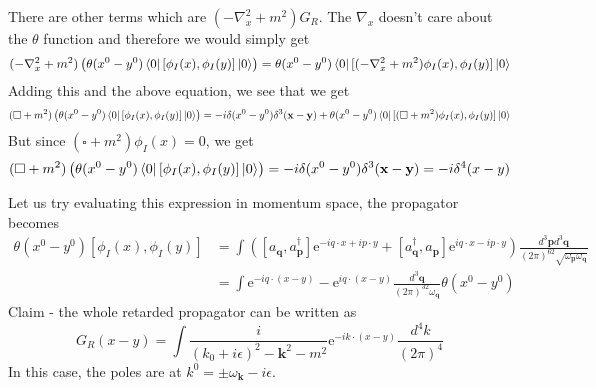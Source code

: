 \documentclass[11pt, notitlepage]{report}
\newcommand{\e}{\mathrm{e}}
\newcommand{\w}{\omega}
\renewcommand{\a}[1]{a_\mathbf{#1}}
\newcommand{\adag}[1]{a^\dagger_\mathbf{#1}}
\numberwithin{equation}{section}
\begin{document}
    There are other terms which are \((-\nabla_x^2 + m^2) G_R\). The \(\nabla_x\) doesn't care about the \(\theta\) function and therefore we would simply get 
    \begin{equation*}
        (-\nabla_x^2 + m^2) \left(\theta(x^0 - y^0)\bra{0}[\phi_I(x), \phi_I(y) ]\ket{0}\right) = \theta(x^0 - y^0)\bra{0}[(-\nabla_x^2 + m^2)\phi_I(x), \phi_I(y) ]\ket{0}
    \end{equation*}
    Adding this and the above equation, we see that we get 
    \begin{equation*}
        (\square + m^2)\left(\theta(x^0 - y^0)\bra{0}[\phi_I(x), \phi_I(y) ]\ket{0}\right) = -i\delta(x^0 - y^0)\delta^3(\textbf{x} - \textbf{y}) + \theta(x^0 - y^0) \bra{0}[(\square + m^2)\phi_I(x), \phi_I(y) ]\ket{0}
    \end{equation*}
    But since \((\square + m^2)\phi_I(x) = 0\), we get 
    \begin{equation*}
        (\square + m^2)\left(\theta(x^0 - y^0)\bra{0}[\phi_I(x), \phi_I(y) ]\ket{0}\right) = -i\delta(x^0 - y^0)\delta^3(\textbf{x} - \textbf{y}) = -i\delta^4(x-y)
    \end{equation*}

    Let us try evaluating this expression in momentum space, the propagator becomes 
    \begin{align*}
        \theta(x^0 - y^0)[\phi_I(x), \phi_I(y)] &= \int \left(  [\a{q}, \adag{p}] \e^{-iq\cdot x + ip\cdot y} + [\adag{q}, \a{p}]\e^{iq\cdot x - ip\cdot y}  \right)\frac{d^3\textbf{p}d^3\textbf{q}}{(2\pi)^62\sqrt{\w_\textbf{p}\w_\textbf{q}}}\\
        &= \int \e^{-iq\cdot(x-y)} - \e^{iq\cdot (x-y)} \frac{d^3\textbf{q}}{(2\pi)^32\w_\textbf{q}}\theta(x^0 - y^0)
    \end{align*}
    Claim - the whole retarded propagator can be written as 
    \begin{equation*}
        G_R(x-y) = \int \frac{i}{(k_0 + i\epsilon)^2 - \textbf{k}^2 - m^2} \e^{-ik\cdot(x-y)} \frac{d^4k}{(2\pi)^4}
    \end{equation*}
    In this case, the poles are at \(k^0 = \pm \w_\textbf{k} - i\epsilon\).
\end{document}
